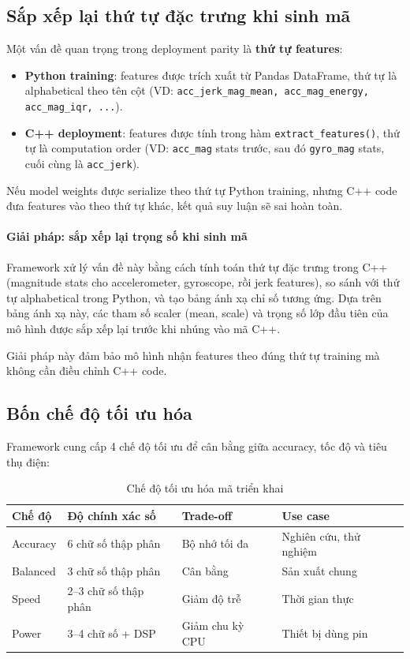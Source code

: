 \subsection{Sắp xếp lại thứ tự đặc trưng khi sinh mã}
\label{subsec:feature_reordering}

Một vấn đề quan trọng trong deployment parity là \textbf{thứ tự features}:
\begin{itemize}
    \item \textbf{Python training}: features được trích xuất từ Pandas DataFrame, thứ tự là alphabetical theo tên cột (VD: \texttt{acc\_jerk\_mag\_mean, acc\_mag\_energy, acc\_mag\_iqr, ...}).
    \item \textbf{C++ deployment}: features được tính trong hàm \texttt{extract\_features()}, thứ tự là computation order (VD: \texttt{acc\_mag} stats trước, sau đó \texttt{gyro\_mag} stats, cuối cùng là \texttt{acc\_jerk}).
\end{itemize}

Nếu model weights được serialize theo thứ tự Python training, nhưng C++ code đưa features vào theo thứ tự khác, kết quả suy luận sẽ sai hoàn toàn.

\paragraph{Giải pháp: sắp xếp lại trọng số khi sinh mã}
Framework xử lý vấn đề này bằng cách tính toán thứ tự đặc trưng trong C++ (magnitude stats cho accelerometer, gyroscope, rồi jerk features), so sánh với thứ tự alphabetical trong Python, và tạo bảng ánh xạ chỉ số tương ứng. Dựa trên bảng ánh xạ này, các tham số scaler (mean, scale) và trọng số lớp đầu tiên của mô hình được sắp xếp lại trước khi nhúng vào mã C++.

Giải pháp này đảm bảo mô hình nhận features theo đúng thứ tự training mà không cần điều chỉnh C++ code.

\subsection{Bốn chế độ tối ưu hóa}
\label{subsec:optimization_modes}

Framework cung cấp 4 chế độ tối ưu để cân bằng giữa accuracy, tốc độ và tiêu thụ điện:

\begin{table}[H]
\centering
\caption{Chế độ tối ưu hóa mã triển khai}
\label{tab:optimization_modes}
\begin{tabular}{@{}llll@{}}
\toprule
\textbf{Chế độ} & \textbf{Độ chính xác số} & \textbf{Trade-off} & \textbf{Use case} \\ \midrule
Accuracy & 6 chữ số thập phân & Bộ nhớ tối đa & Nghiên cứu, thử nghiệm \\
Balanced & 3 chữ số thập phân & Cân bằng & Sản xuất chung \\
Speed & 2--3 chữ số thập phân & Giảm độ trễ & Thời gian thực \\
Power & 3--4 chữ số + DSP & Giảm chu kỳ CPU & Thiết bị dùng pin \\ \bottomrule
\end{tabular}
\end{table}

